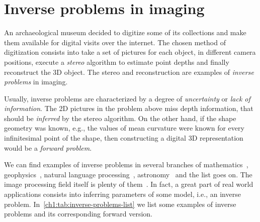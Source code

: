 \section{Inverse problems in imaging}

An archaeological museum decided to digitize some of its collections and make them available for digital visits over the internet. The chosen method of digitization consists into take a set of pictures for each object, in different camera positions, execute a \emph{stereo} algorithm to estimate point depths and finally reconstruct the 3D object. The stereo and reconstruction are examples of \emph{inverse problems} in imaging.

Usually, inverse problems are characterized by a degree of \emph{uncertainty} or \emph{lack of information}. The 2D pictures in the problem above miss depth information, that should be \emph{inferred} by the stereo algorithm. On the other hand, if the shape geometry was known, e.g., the values of mean curvature were known for every infinitesimal point of the shape, then constructing a digital 3D representation would be a \emph{forward problem}. 

We can find examples of inverse problems in several branches of mathematics~\cite{kirsch96}, geophysics~\cite{zhdanov15}, natural language processing~\cite{stroppa05}, astronomy~\cite{lucy94} and the list goes on. The image processing field itself is plenty of them~\cite{bertero98}. In fact, a great part of real world applications consists into inferring parameters of some model, i.e., an inverse problem. In~\cref{ch1:tab:inverse-problems-list} we list some examples of inverse problems and its corresponding forward version.

